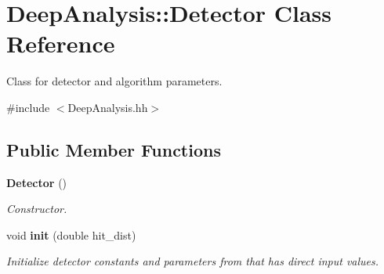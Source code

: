 \section{DeepAnalysis::Detector Class Reference}
\label{classDeepAnalysis_1_1Detector}


Class for detector and algorithm parameters.  


{\ttfamily \#include $<$DeepAnalysis.hh$>$}\subsection*{Public Member Functions}
\begin{DoxyCompactItemize}
\item 
{\bf Detector} ()
\begin{DoxyCompactList}\small\item\em Constructor. \item\end{DoxyCompactList}\item 
void {\bf init} (double hit\_\-dist)
\begin{DoxyCompactList}\small\item\em Initialize detector constants and parameters from that has direct input values. \item\end{DoxyCompactList}\end{DoxyCompactItemize}
